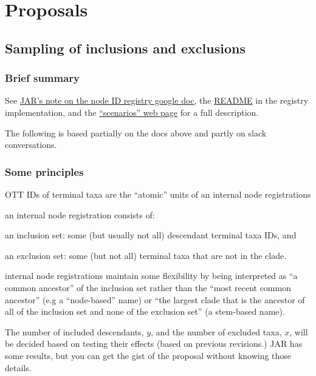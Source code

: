 \documentclass[11pt]{article}
\begin{document}
\section{Proposals}
\subsection{Sampling of inclusions and exclusions}
\subsubsection{Brief summary}
See \href{https://docs.google.com/document/d/1hJHjMckLywnoBuY1xG3I0hP-rsl4l8du3iA8kflEOQE/edit#}{JAR's note on the node ID registry google doc}, the 
\href{https://github.com/OpenTreeOfLife/reference-taxonomy/blob/registry/registry/README.md}{README} in the registry implementation,
and the \href{https://rawgit.com/OpenTreeOfLife/reference-taxonomy/registry/registry/doc/scenarios.html}{``scenarios'' web page} for 
a full description.

The following is based partially on the docs above and partly on slack conversations.

\subsubsection{Some principles}
\begin{compactenum}
  \item OTT IDs of terminal taxa are the ``atomic'' units of an internal node registrations
  \item an internal node registration consists of:
  \begin{compactitem}
    \item an inclusion set: some (but usually not all) descendant terminal taxa IDs, and
    \item an exclusion set: some (but not all) terminal taxa that are not in the clade.
  \end{compactitem}
  \item internal node registrations maintain some flexibility by being interpreted as ``a 
  common ancestor'' of the inclusion set rather than the ``most recent common 
  ancestor'' (e.g a ``node-based'' name) or ``the largest clade that is the 
  ancestor of all of the inclusion set and none of the exclusion set'' (a stem-based name).
  \item The number of included descendants, $y$, and the number of excluded taxa, $x$, will
    be decided based on testing their effects (based on previous revisions.) JAR has some
    results, but you can get the gist of the proposal without knowing those details.
\end{compactenum}
\end{document}
